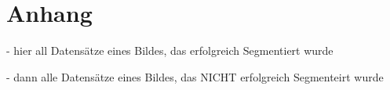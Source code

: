 \chapter{Anhang}
\label{chap:anhang}

- hier all Datensätze eines Bildes, das erfolgreich Segmentiert wurde

- dann alle Datensätze eines Bildes, das NICHT erfolgreich Segmenteirt wurde